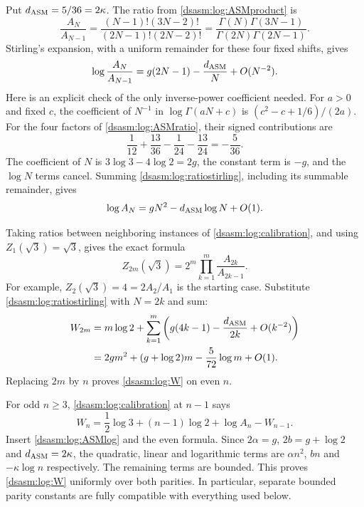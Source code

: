 \documentclass[11pt,letterpaper]{article}
\theoremstyle{remark}\newtheorem{remark}[theorem]{Remark}
\begin{document}
Put $d_{\rm ASM}=5/36=2\kappa$. The ratio from \eqref{dsasm:log:ASMproduct} is
\begin{equation}\label{dsasm:log:ASMratio}
 \frac{A_N}{A_{N-1}}
 =\frac{(N-1)!(3N-2)!}{(2N-1)!(2N-2)!}
 =\frac{\Gamma(N)\Gamma(3N-1)}{\Gamma(2N)\Gamma(2N-1)}.
\end{equation}
Stirling's expansion, with a uniform remainder for these four fixed
shifts, gives
\begin{equation}\label{dsasm:log:ratiostirling}
 \log\frac{A_N}{A_{N-1}}=g(2N-1)-\frac{d_{\rm ASM}}N+O(N^{-2}).
\end{equation}
Here is an explicit check of the only inverse-power coefficient needed.
For $a>0$ and fixed $c$, the coefficient of $N^{-1}$ in
$\log\Gamma(aN+c)$ is $(c^2-c+1/6)/(2a)$.
For the four factors of \eqref{dsasm:log:ASMratio}, their signed contributions
are
\[
 \frac1{12}+\frac{13}{36}-\frac1{24}-\frac{13}{24}
 =-\frac5{36}.
\]
The coefficient of $N$ is $3\log3-4\log2=2g$, the constant term is
$-g$, and the $\log N$ terms cancel. Summing \eqref{dsasm:log:ratiostirling},
including its summable remainder, gives
\begin{equation}\label{dsasm:log:ASMlog}
 \log A_N=gN^2-d_{\rm ASM}\log N+O(1).
\end{equation}

Taking ratios between neighboring instances of \eqref{dsasm:log:calibration},
and using $Z_1(\sqrt3)=\sqrt3$, gives the exact formula
\begin{equation}\label{dsasm:log:evenproduct}
 Z_{2m}(\sqrt3)=2^m\prod_{k=1}^m\frac{A_{2k}}{A_{2k-1}}.
\end{equation}
For example, $Z_2(\sqrt3)=4=2A_2/A_1$ is the starting case.
Substitute \eqref{dsasm:log:ratiostirling} with $N=2k$ and sum:
\begin{align*}
 W_{2m}
 &=m\log2+\sum_{k=1}^m\left(g(4k-1)-\frac{d_{\rm ASM}}{2k}+O(k^{-2})\right)\\
 &=2gm^2+(g+\log2)m-\frac5{72}\log m+O(1).
\end{align*}
Replacing $2m$ by $n$ proves \eqref{dsasm:log:W} on even $n$.

For odd $n\ge3$, \eqref{dsasm:log:calibration} at $n-1$ says
\[
 W_n=\frac12\log3+(n-1)\log2+\log A_n-W_{n-1}.
\]
Insert \eqref{dsasm:log:ASMlog} and the even formula. Since $2\alpha=g$,
$2b=g+\log2$ and $d_{\rm ASM}=2\kappa$, the quadratic, linear and logarithmic
terms are $\alpha n^2$, $bn$ and $-\kappa\log n$ respectively.
The remaining terms are bounded. This proves \eqref{dsasm:log:W} uniformly
over both parities. In particular, separate bounded parity constants
are fully compatible with everything used below.
\end{document}
